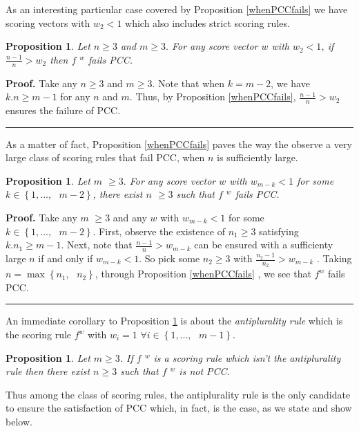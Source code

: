 \documentclass{article}
\newtheorem{proposition}[theorem]{Proposition}
\newenvironment{proof}[1][Proof]{\noindent\textbf{#1.} }{\ \rule{0.5em}{0.5em}}
\begin{document}
As an interesting particular case covered by Proposition \ref{whenPCCfails}
we have scoring vectors with $w_{2}<1$ which also includes strict scoring
rules.

\begin{proposition}
Let $n\geq 3$ and $m\geq 3.$ For any score vector $w$ with $w_{2}<1$, if $%
\frac{n-1}{n}>w_{2}$ then $f$ $^{w}$ fails PCC.
\end{proposition}

\begin{proof}
Take any $n\geq 3$ and $m\geq 3.$ Note that when $k=m-2$, we have $k.n\geq
m-1$ for any $n$ and $m.$ Thus, by Proposition \ref{whenPCCfails}, $\frac{n-1%
}{n}>w_{2}$ ensures the failure of PCC.
\end{proof}

As a matter of fact, Proposition \ref{whenPCCfails} paves the way the
observe a very large class of scoring rules that fail PCC, when $n$ is
sufficiently large.

\begin{proposition}
\label{nlargefailspcc} \bigskip Let $m$ $\geq 3.$ For any score vector $w$
with $w_{m-k}<1$ for some $k\in \left\{ 1,...,\text{ }m-2\right\} $, there
exist $n$ $\geq 3$ such that $f$ $^{w}$ fails PCC.
\end{proposition}

\begin{proof}
Take any $m$ $\geq 3$ and any $w$ with $w_{m-k}<1$ for some $k\in \left\{
1,...,\text{ }m-2\right\} $. First, observe the existence of $n_{1}\geq 3$
satisfying $k.n_{1}\geq m-1$. Next, note that $\frac{n-1}{n}>w_{m-k}$ can be
ensured with a sufficienty large $n$ if and only if $w_{m-k}<1$. So pick
some $n_{2}\geq 3$ with $\frac{n_{2}-1}{n_{2}}>w_{m-k}$ . Taking $n=\max
\left\{ n_{1},\text{ }n_{2}\right\} $, through Proposition \ref{whenPCCfails}%
, we see that $f^{w}$ fails PCC.
\end{proof}

An immediate corollary to Proposition \ref{nlargefailspcc} is about the 
\textit{antiplurality rule }which is the scoring rule $f^{w}$ with $w_{i}=1$ 
$\forall i\in \left\{ 1,...,\text{ }m-1\right\} .$

\begin{proposition}
Let $m\geq 3$. If $f$ $^{w}$ is a scoring rule which isn't the antiplurality
rule then there exist $n\geq 3$ such that $f$ $^{w}$ is not PCC.
\end{proposition}

Thus among the class of scoring rules, the antiplurality rule is the only
candidate to ensure the satisfaction of PCC which, in fact, is the case, as
we state and show below.
\end{document}
